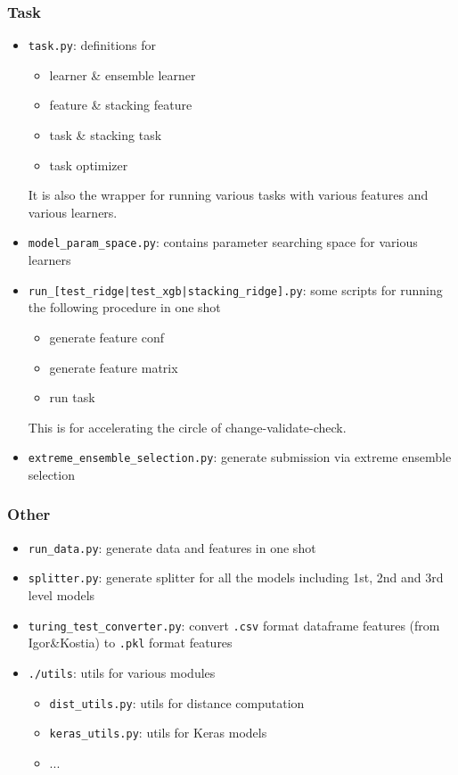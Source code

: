 \documentclass[12pt]{article}
\begin{document}
{{\subsubsection{Task}
\begin{itemize}
\item \texttt{task.py}: definitions for
\begin{itemize}
\item learner \& ensemble learner
\item feature \& stacking feature
\item task \& stacking task
\item task optimizer
\end{itemize}
It is also the wrapper for running various tasks with various features and various learners.
\item \texttt{model\_param\_space.py}: contains parameter searching space for various learners
\item \texttt{run\_[test\_ridge|test\_xgb|stacking\_ridge].py}: some scripts for running the following procedure in one shot
\begin{itemize}
\item generate feature conf
\item generate feature matrix
\item run task
\end{itemize}
This is for accelerating the circle of change-validate-check.
\item \texttt{extreme\_ensemble\_selection.py}: generate submission via extreme ensemble selection
\end{itemize}
\subsubsection{Other}
\begin{itemize}
\item \texttt{run\_data.py}: generate data and features in one shot
\item \texttt{splitter.py}: generate splitter for all the models including 1st, 2nd and 3rd level models
\item \texttt{turing\_test\_converter.py}: convert \texttt{.csv} format dataframe features (from Igor\&Kostia) to \texttt{.pkl} format features
\item \texttt{./utils}: utils for various modules
\begin{itemize}
\item \texttt{dist\_utils.py}: utils for distance computation
\item \texttt{keras\_utils.py}: utils for Keras models
\item ...
\end{itemize}
\end{itemize}



}}
\end{document}
